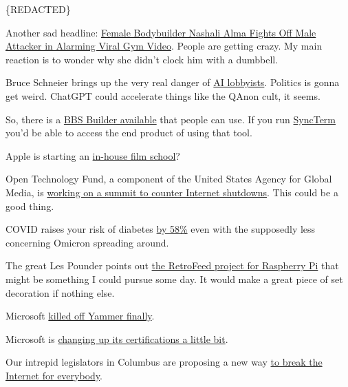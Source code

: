 \{REDACTED\}

Another sad headline:
\href{https://fitnessvolt.com/nashali-alma-fights-off-male-attacker-gym/}{Female
Bodybuilder Nashali Alma Fights Off Male Attacker in Alarming Viral Gym
Video}. People are getting crazy. My main reaction is to wonder why she
didn't clock him with a dumbbell.

Bruce Schneier brings up the very real danger of
\href{https://www.schneier.com/blog/archives/2023/02/defending-against-ai-lobbyists.html}{AI
lobbyists}. Politics is gonna get weird. ChatGPT could accelerate things
like the QAnon cult, it seems.

So, there is a
\href{https://hackaday.com/2023/02/16/bbs-builder-is-a-framework-for-running-your-own-petscii-paradise/}{BBS
Builder available} that people can use. If you run
\href{http://www.syncterm.net}{SyncTerm} you'd be able to access the end
product of using that tool.

Apple is starting an
\href{https://appleinsider.com/articles/23/02/17/apple-tv-needs-more-content-and-they-will-train-directors-to-get-it?utm_medium=rss}{in-house
film school}?

Open Technology Fund, a component of the United States Agency for Global
Media, is
\href{https://www.opentech.fund/news/otf-debrief-introducing-the-shutdown-getdown/}{working
on a summit to counter Internet shutdowns}. This could be a good thing.

COVID raises your risk of diabetes
\href{https://arstechnica.com/?p=1918140}{by 58\%} even with the
supposedly less concerning Omicron spreading around.

The great Les Pounder points out
\href{https://www.tomshardware.com/news/raspberry-pi-retro-news-project}{the
RetroFeed project for Raspberry Pi} that might be something I could
pursue some day. It would make a great piece of set decoration if
nothing else.

Microsoft
\href{https://www.techradar.com/news/microsoft-kills-off-the-enterprise-social-network-no-one-remembered-it-has}{killed
off Yammer finally}.

Microsoft is
\href{https://techcommunity.microsoft.com/t5/microsoft-learn-blog/evolving-microsoft-365-certifications-help-keep-you-in-sync-with/ba-p/3719265}{changing
up its certifications a little bit}.

Our intrepid legislators in Columbus are proposing a new way
\href{https://www.statenews.org/government-politics/2023-02-13/ohio-budget-includes-provision-to-require-social-media-companies-get-parental-permission-for-kids}{to
break the Internet for everybody}.

